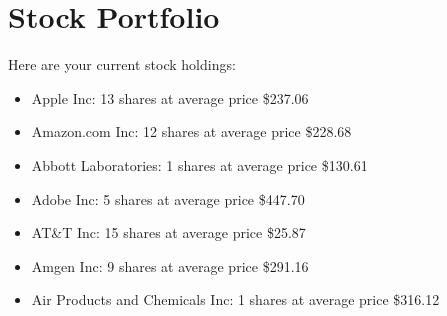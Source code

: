 \documentclass{article}
\begin{document}
\section*{Stock Portfolio}

Here are your current stock holdings:

\begin{itemize}
\item Apple Inc: 13 shares at average price \$237.06
\item Amazon.com Inc: 12 shares at average price \$228.68
\item Abbott Laboratories: 1 shares at average price \$130.61
\item Adobe Inc: 5 shares at average price \$447.70
\item AT&T Inc: 15 shares at average price \$25.87
\item Amgen Inc: 9 shares at average price \$291.16
\item Air Products and Chemicals Inc: 1 shares at average price \$316.12
\end{itemize}
\end{document}
